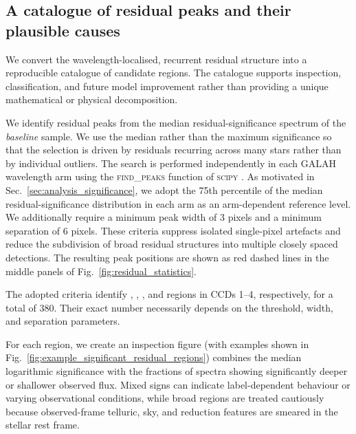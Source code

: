 \documentclass[twocolumn,apj,numberedappendix,appendixfloats]{openjournal}
\begin{document}
\subsection{A catalogue of residual peaks and their plausible causes}
\label{sec:analysis_peak_catalogue}

We convert the wavelength-localised, recurrent residual structure into a reproducible catalogue of candidate regions. The catalogue supports inspection, classification, and future model improvement rather than providing a unique mathematical or physical decomposition.

We identify residual peaks from the median residual-significance spectrum of the \textit{baseline} sample. We use the median rather than the maximum significance so that the selection is driven by residuals recurring across many stars rather than by individual outliers. The search is performed independently in each GALAH wavelength arm using the \textsc{find\_peaks} function of \textsc{scipy} \citep{Scipy}. As motivated in Sec.~\ref{sec:analysis_significance}, we adopt the 75th percentile of the median residual-significance distribution in each arm as an arm-dependent reference level. We additionally require a minimum peak width of 3 pixels and a minimum separation of 6 pixels. These criteria suppress isolated single-pixel artefacts and reduce the subdivision of broad residual structures into multiple closely spaced detections. The resulting peak positions are shown as red dashed lines in the middle panels of Fig.~\ref{fig:residual_statistics}.

The adopted criteria identify , , , and  regions in CCDs 1--4, respectively, for a total of 380. Their exact number necessarily depends on the threshold, width, and separation parameters.

For each region, we create an inspection figure (with examples shown in Fig.~\ref{fig:example_significant_residual_regions}) combines the median logarithmic significance with the fractions of spectra showing significantly deeper or shallower observed flux. Mixed signs can indicate label-dependent behaviour or varying observational conditions, while broad regions are treated cautiously because observed-frame telluric, sky, and reduction features are smeared in the stellar rest frame.
\end{document}

